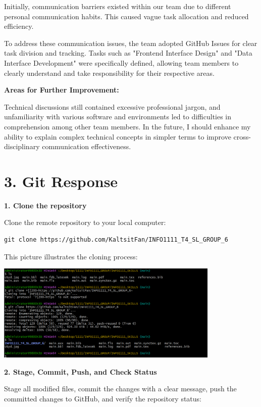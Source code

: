 \documentclass[a4paper, 11pt]{report}
\begin{document}
Initially, communication barriers existed within our team due to different personal communication habits. This caused vague task allocation and reduced efficiency.

To address these communication issues, the team adopted GitHub Issues for clear task division and tracking. Tasks such as "Frontend Interface Design" and "Data Interface Development" were specifically defined, allowing team members to clearly understand and take responsibility for their respective areas.

\textbf{Areas for Further Improvement:}

Technical discussions still contained excessive professional jargon, and unfamiliarity with various software and environments led to difficulties in comprehension among other team members. In the future, I should enhance my ability to explain complex technical concepts in simpler terms to improve cross-disciplinary communication effectiveness.

\section*{3. Git Response}

\textbf{1. Clone the repository}

Clone the remote repository to your local computer:
\begin{verbatim}
git clone https://github.com/KaltsitFan/INFO1111_T4_SL_GROUP_6
\end{verbatim}

This picture illustrates the cloning process:

\begin{center}
\includegraphics[width=0.8\textwidth]{kaffa/clone.png}
\end{center}

\textbf{2. Stage, Commit, Push, and Check Status}

Stage all modified files, commit the changes with a clear message, push the committed changes to GitHub, and verify the repository status:
\end{document}
